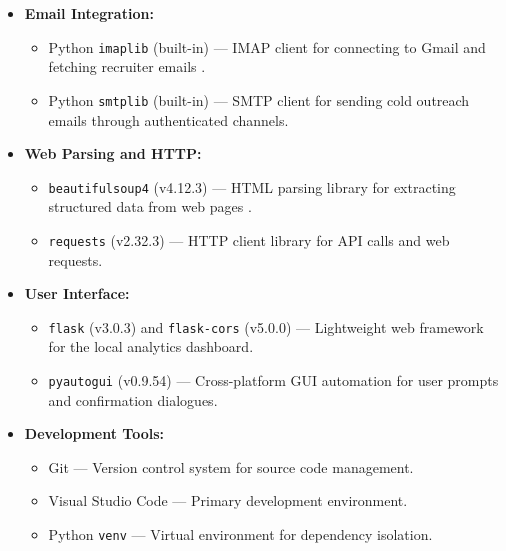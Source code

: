 \documentclass[12pt, a4paper, oneside]{report}
\begin{document}
\begin{itemize}
    \begin{itemize}
        \item SQLite3 (built-in Python module) --- Embedded relational database for application tracking, lifecycle events, and cold email records \cite{ref13}.
        \item \texttt{pandas} (v2.2.3) --- Data manipulation library used for CSV/XLSX processing and report generation \cite{ref14}.
        \item \texttt{openpyxl} (v3.1.5) --- Excel file creation and formatting for colour-coded application reports with hyperlinks.
    \end{itemize}
    \item \textbf{Email Integration:}
    \begin{itemize}
        \item Python \texttt{imaplib} (built-in) --- IMAP client for connecting to Gmail and fetching recruiter emails \cite{ref15}.
        \item Python \texttt{smtplib} (built-in) --- SMTP client for sending cold outreach emails through authenticated channels.
    \end{itemize}
    \item \textbf{Web Parsing and HTTP:}
    \begin{itemize}
        \item \texttt{beautifulsoup4} (v4.12.3) --- HTML parsing library for extracting structured data from web pages \cite{ref16}.
        \item \texttt{requests} (v2.32.3) --- HTTP client library for API calls and web requests.
    \end{itemize}
    \item \textbf{User Interface:}
    \begin{itemize}
        \item \texttt{flask} (v3.0.3) and \texttt{flask-cors} (v5.0.0) --- Lightweight web framework for the local analytics dashboard.
        \item \texttt{pyautogui} (v0.9.54) --- Cross-platform GUI automation for user prompts and confirmation dialogues.
    \end{itemize}
    \item \textbf{Development Tools:}
    \begin{itemize}
        \item Git --- Version control system for source code management.
        \item Visual Studio Code --- Primary development environment.
        \item Python \texttt{venv} --- Virtual environment for dependency isolation.
    \end{itemize}
\end{itemize}
\end{document}
